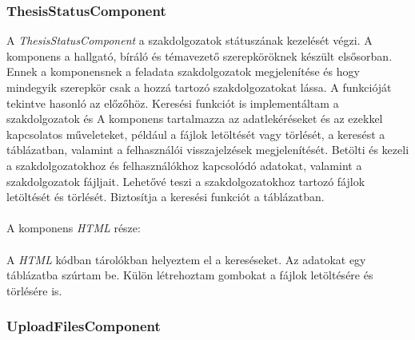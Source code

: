 \subsubsection{ThesisStatusComponent}

A \textit{ThesisStatusComponent} a szakdolgozatok státuszának kezelését végzi. A komponens a hallgató, bíráló és témavezető szerepköröknek készült elsősorban. Ennek a komponensnek a feladata szakdolgozatok megjelenítése és hogy mindegyik szerepkör csak a hozzá tartozó szakdolgozatokat lássa. A funkcióját tekintve hasonló az előzőhöz. Keresési funkciót is implementáltam a szakdolgozatok és  A komponens tartalmazza az adatlekéréseket és az ezekkel kapcsolatos műveleteket, például a fájlok letöltését vagy törlését, a keresést a táblázatban, valamint a felhasználói visszajelzések megjelenítését. Betölti és kezeli a szakdolgozatokhoz és felhasználókhoz kapcsolódó adatokat, valamint a szakdolgozatok fájljait. Lehetővé teszi a szakdolgozatokhoz tartozó fájlok letöltését és törlését. Biztosítja a keresési funkciót a táblázatban.\\
\\
A komponens \textit{HTML} része:\\
\\
A \textit{HTML} kódban tárolókban helyeztem el a kereséseket. Az adatokat egy táblázatba szúrtam be. Külön létrehoztam gombokat a fájlok letöltésére és törlésére is.

\subsubsection{UploadFilesComponent}

